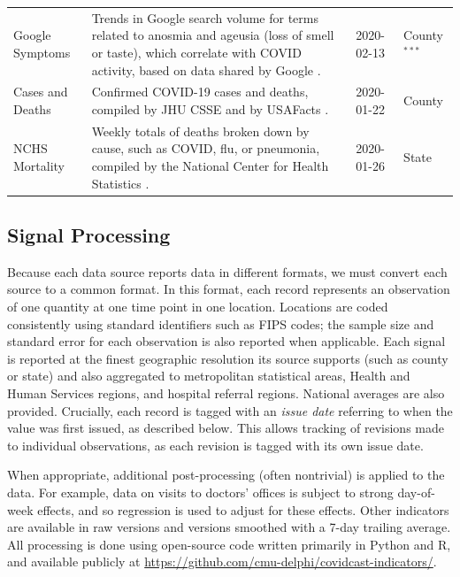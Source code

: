 \documentclass[9pt,twocolumn,twoside,lineno]{pnas-new}
\begin{document}
\begin{table}[t]
\begin{tabular}{>{\raggedright}p{1.2in} p{4.0in} l >{\raggedright\arraybackslash}p{0.5in}}
  Google Symptoms & Trends in Google search volume for terms related to
anosmia and ageusia (loss of smell or taste), which correlate with COVID
activity, based on data shared by Google \cite{GoogleSymptoms}. & 2020-02-13 &
County$^{***}$ \\
  Cases and Deaths & Confirmed COVID-19 cases and deaths, compiled by JHU CSSE 
\cite{Dong:2020} and by USAFacts \cite{USAFacts}. & 2020-01-22 & County \\
    NCHS Mortality & Weekly totals of deaths broken down by cause, such as
COVID, flu, or pneumonia, compiled by the National Center for Health Statistics
\cite{NCHS}. & 2020-01-26 & State \\
  \bottomrule
\end{tabular}
\label{tab:sources_signals}
\end{table}

\subsection{Signal Processing}

Because each data source reports data in different formats, we must convert each
source to a common format. In this format, each record represents an observation
of one quantity at one time point in one location. Locations are coded
consistently using standard identifiers such as FIPS codes; the sample size and
standard error for each observation is also reported when applicable. Each
signal is reported at the finest geographic resolution its source supports (such
as county or state) and also aggregated to metropolitan statistical areas,
Health and Human Services regions, and hospital referral regions. National
averages are also provided. Crucially, each record is tagged with an
\textit{issue date} referring to when the value was first issued, as described 
below. This allows tracking of revisions made to individual observations, as
each revision is tagged with its own issue date.  

When appropriate, additional post-processing (often nontrivial) is applied to
the data. For example, data on visits to doctors' offices is subject to strong
day-of-week effects, and so regression is used to adjust for these
effects. Other indicators are available in raw versions and versions smoothed 
with a 7-day trailing average. All processing is done using open-source code 
written primarily in Python and R, and available publicly at
\url{https://github.com/cmu-delphi/covidcast-indicators/}.
\end{document}

